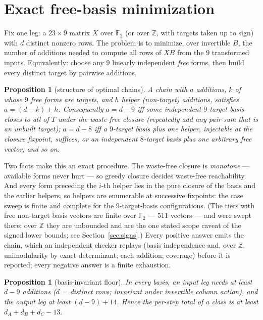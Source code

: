 \documentclass[11pt]{article}
\newtheorem{proposition}[theorem]{Proposition}
\theoremstyle{definition}
\theoremstyle{remark}
\newcommand{\F}{\mathbb{F}}
\newcommand{\Z}{\mathbb{Z}}
\begin{document}
\section{Exact free-basis minimization}\label{sec:method}

Fix one leg: a $23\times9$ matrix $X$ over $\F_2$ (or over $\Z$, with
targets taken up to sign) with $d$ distinct nonzero rows.  The
problem is to minimize, over invertible $B$, the number of additions
needed to compute all rows of $XB$ from the $9$ transformed inputs.
Equivalently: choose any $9$ linearly independent \emph{free} forms,
then build every distinct target by pairwise additions.

\begin{proposition}[structure of optimal chains]\label{prop:tiers}
A chain with $a$ additions, $k$ of whose $9$ free forms are targets,
and $h$ helper (non-target) additions, satisfies $a=(d-k)+h$.
Consequently $a=d-9$ iff some independent $9$-target basis closes to
all of $T$ under the waste-free closure (repeatedly add any pair-sum
that is an unbuilt target); $a=d-8$ iff a $9$-target basis plus one
helper, injectable at the closure fixpoint, suffices, or an
independent $8$-target basis plus one arbitrary free vector; and so on.
\end{proposition}

Two facts make this an exact procedure.  The waste-free closure is
\emph{monotone} --- available forms never hurt --- so greedy closure
decides waste-free reachability.  And every form preceding the $i$-th
helper lies in the pure closure of the basis and the earlier helpers,
so helpers are enumerable at successive fixpoints: the case sweep is
finite and complete for the $9$-target-basis configurations.  (The
tiers with free non-target basis vectors are finite over $\F_2$ ---
$511$ vectors --- and were swept there; over $\Z$ they are unbounded
and are the one stated scope caveat of the signed lower bounds; see
Section~\ref{sec:signs}.)  Every positive answer emits the chain,
which an independent checker replays (basis independence and, over
$\Z$, unimodularity by exact determinant; each addition; coverage)
before it is reported; every negative answer is a finite exhaustion.

\begin{proposition}[basis-invariant floor]\label{prop:floor}
In every basis, an input leg needs at least $d-9$ additions ($d$ =
distinct rows; invariant under invertible column action), and the
output leg at least $(d-9)+14$.  Hence the per-step total of a class
is at least $d_A+d_B+d_C-13$.
\end{proposition}
\end{document}
